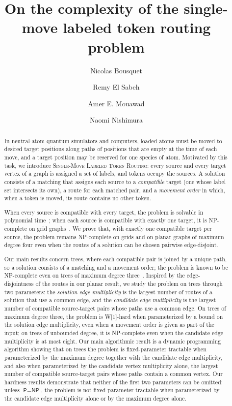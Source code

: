 \documentclass[a4paper,USenglish,thm-restate]{lipics-v2021}
\title{On the complexity of the single-move labeled token routing problem}
\author{Nicolas Bousquet}{CNRS, Univ.\ Lyon, Universit\'e Lyon 1, INSA Lyon, LIRIS UMR CNRS 5205, F-69621 Villeurbanne, France}{nicolas.bousquet@cnrs.fr}{https://orcid.org/0000-0003-0170-0503}{}
\author{Remy {El Sabeh}}{David R. Cheriton School of Computer Science, University of Waterloo, Waterloo, ON, Canada}{relsabeh@uwaterloo.ca}{https://orcid.org/0000-0002-3786-4035}{}
\author{Amer E. Mouawad}{American University of Beirut, Beirut, Lebanon \and David R. Cheriton School of Computer Science, University of Waterloo, Waterloo, ON, Canada}{aa368@aub.edu.lb}{}{}
\author{Naomi Nishimura}{David R. Cheriton School of Computer Science, University of Waterloo, Waterloo, ON, Canada}{nishi@uwaterloo.ca}{}{}
\theoremstyle{problemstyle}
\begin{document}
\nolinenumbers

\maketitle

\begin{abstract}
In neutral-atom quantum simulators and computers, loaded atoms must be moved
to desired target positions along paths of positions that are empty at the
time of each move, and a target position may be reserved for one species of atom. Motivated by this task, we introduce \textsc{Single-Move
Labeled Token Routing}: every source and every target vertex of a graph is
assigned a set of labels, and tokens occupy the sources. A solution consists
of a matching that assigns each source to a \emph{compatible} target (one whose label
set intersects its own), a route for each matched pair, and a \emph{movement
order} in which, when a token is moved, its route contains no other token.

When every source is
compatible with every target, the problem is solvable in polynomial
time~\cite{Calinescu2008Reconfigurations}; when each source is compatible
with exactly one target, it is \textsf{NP}-complete on grid
graphs~\cite{GeftHalperinNakar2024}. We prove that, with exactly one
compatible target per source, the problem remains \textsf{NP}-complete on
grids and on planar graphs of maximum degree four even when the routes of a
solution can be chosen pairwise edge-disjoint.

Our main results concern trees, where each compatible pair is joined by a
unique path, so a solution consists of a matching and a movement order; the
problem is known to be \textsf{NP}-complete even on trees of maximum degree
three~\cite{Geft2026Trees}. Inspired by the edge-disjointness of the routes
in our planar result, we study the problem on trees through two
parameters: the \emph{solution edge multiplicity} is
the largest number of routes of a solution that use a common edge, and the
\emph{candidate edge multiplicity} is the largest number of compatible
source-target pairs whose paths use a common edge. On trees of maximum degree
three, the problem is \textsf{W}[1]-hard when parameterized by a bound on the
solution edge multiplicity, even when a movement order is given as part of the input;
on trees of unbounded degree, it is \textsf{NP}-complete even when the
candidate edge multiplicity is at most eight. Our main algorithmic result
is a dynamic programming algorithm showing that on trees the problem is
fixed-parameter tractable when parameterized by the maximum degree together
with the candidate edge multiplicity, and also when parameterized by the
candidate vertex multiplicity alone, the largest number of compatible
source-target pairs whose paths contain a common vertex. Our hardness results
demonstrate that neither of the first two parameters can be omitted:
unless $\textsf{P}=\textsf{NP}$, the problem is not fixed-parameter tractable when parameterized by the
candidate edge multiplicity alone or by the maximum degree alone.
\end{abstract}
\end{document}
